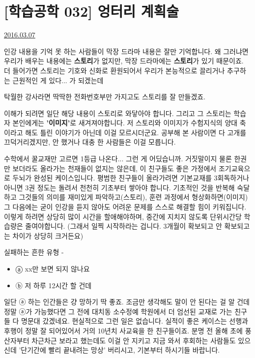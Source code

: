 \section{[학습공학 032] 엉터리 계획술}
\href{https://www.kockoc.com/Apoc/667250}{2016.03.07}

\vspace{5mm}

인강 내용을 기억 못 하는 사람들이 막장 드라마 내용은 잘만 기억합니다.
왜 그러냐면 우리가 배우는 내용에는 \textbf{스토리}가 없지만, 막장 드라마에는 \textbf{스토리}가 있기 때문이죠.
더 들어가면 스토리는 기호와 신화로 환원되어서 우리가 본능적으로 끌리거나 추구하는 근원적인 게 있다... 가 되겠는데
\vspace{5mm}

탁월한 강사라면 딱딱한 전화번호부만 가지고도 스토리를 잘 만들겠죠.
\vspace{5mm}

이해가 되려면 일단 해당 내용이 스토리로 와닿아야 합니다.
그리고 그 스토리는 학습자 본인에게는 \textbf{'이미지'}로 새겨져야합니다.
저 스토리와 이미지가 수험지식의 양대 축이라고 해도 틀린 이야기가 아닌데 이걸 모르시더군요.
공부해 본 사람이면 다 고개를 끄덕거리겠지만, 안 했거나 대충 한 사람들은 이걸 모릅니다.
\vspace{5mm}

수학에서 꿀교재만 고르면 1등급 나온다... 그런 게 어딨습니까. 거짓말이지
물론 한권만 보더라도 올라가는 천재들이 없지는 않은데, 이 친구들도 좋은 가정에서 조기교육으로 두뇌가 완성된 케이스입니다.
평범한 친구들이 올라가려면 기본교재를 3회독하거나 아니면 3권 정도는 돌려서 천천히 기초부터 쌓아야 합니다.
기초적인 것을 반복해 숙달하고 그것들의 의미를 재미있게 파악하고(스토리), 훈련 과정에서 형상화하면(이미지)
그 다음에는 굳이 인강을 듣지 않아도 어려운 문제를 스스로 해결할 힘이 키워집니다.
이렇게 하려면 상당히 많이 시간을 할애해야하며, 중간에 지치지 않도록 단위시간당 학습량은 줄여야합니다.
(그래서 일찍 시작하라는 겁니다. 3개월이 확보되고 안 확보되고는 차이가 상당히 크거든요)
\vspace{5mm}

실패하는 흔한 유형 -
\begin{itemize}
    \item ⓐ xx만 보면 되지 않나요
    \item ⓑ 저 하루 12시간 할 건데
\end{itemize}
\vspace{5mm}

일단 ⓐ 하는 인간들은 걍 망하기 딱 좋죠. 조금만 생각해도 말이 안 된다는 걸 알 건데
정말 ⓐ가 가능했다면 그 전에 대치동 소수정예 학원에서 더 엄선된 교재로 가는 친구들 다 명문대 갔겠네요.
현실적으로 그런 일은 없습니다. 실적이 좋은 케이스는 선행과 후행이 정말 잘 되어있어서 거의 10년치 사교육을 한 친구들이죠.
분명 전 올해 초에 풍산자부터 차근차근 보라고 했는데도 이걸 안 지키고 지금 와서 후회하는 사람들도 있으신데
'단기간에 빨리 끝내려는 망상' 버리시고, 기본부터 하시기들 바랍니다.
\vspace{5mm}


